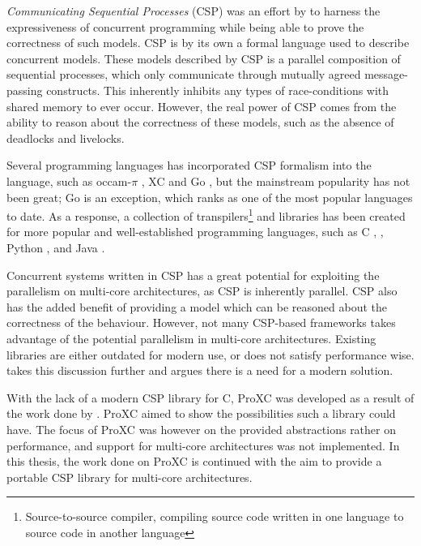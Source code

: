 \textit{Communicating Sequential Processes} (CSP) was an effort by \citet{hoare1978communicating} to harness the expressiveness of concurrent programming while being able to prove the correctness of such models. CSP is by its own a formal language used to describe concurrent models. These models described by CSP is a parallel composition of sequential processes, which only communicate through mutually agreed message\hyp{}passing constructs. This inherently inhibits any types of race\hyp{}conditions with shared memory to ever occur. However, the real power of CSP comes from the ability to reason about the correctness of these models, such as the absence of deadlocks and livelocks.  

Several programming languages has incorporated CSP formalism into the language, such as occam-$\pi$ \citep{barrett1992occam}, XC \citep{douglas2009programming} and Go \citep{go2009go}, but the mainstream popularity has not been great; Go is an exception, which ranks as one of the most popular languages to date. As a response, a collection of transpilers\footnote{Source\hyp{}to\hyp{}source compiler, compiling source code written in one language to source code in another language} and libraries has been created for more popular and well\hyp{}established programming languages, such as C \citep{pettersen2016proxc}, \Cpp{} \citep{brown2003c++csp,brown2007c++csp2,chalmers2016cppcsp}, Python \citep{bjorndalen2007pycsp}, and Java \citep{welch2007jcsp}. 

Concurrent systems written in CSP has a great potential for exploiting the parallelism on multi\hyp{}core architectures, as CSP is inherently parallel. CSP also has the added benefit of providing a model which can be reasoned about the correctness of the behaviour. However, not many CSP\hyp{}based frameworks takes advantage of the potential parallelism in multi\hyp{}core architectures. Existing libraries are either outdated for modern use, or does not satisfy performance wise.  takes this discussion further and argues there is a need for a modern solution.

With the lack of a modern CSP library for C, ProXC was developed as a result of the work done by \citet{pettersen2016proxc}. ProXC aimed to show the possibilities such a library could have. The focus of ProXC was however on the provided abstractions rather on performance, and support for multi\hyp{}core architectures was not implemented. In this thesis, the work done on ProXC is continued with the aim to provide a portable CSP library for multi\hyp{}core architectures. 

